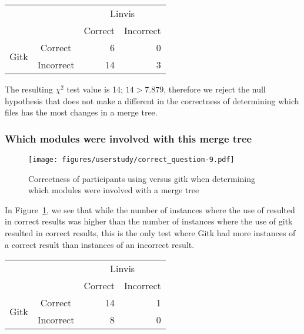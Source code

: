 \begin{center}
  \begin{tabular}{cc|rr}
                           &           & \multicolumn{2}{c}{Linvis}\\
                           &           & Correct                      & Incorrect\\\hline
    \multirow{2}{*}{Gitk}  & Correct   & 6                            & 0\\
                           & Incorrect & 14                           & 3\\
  \end{tabular}
\end{center}

The resulting $\chi^2$ test value is 14; $14 > 7.879$, therefore we
reject the null hypothesis that \tool does not make a different in the
correctness of determining which files has the most changes in a merge
tree.

\subsubsection{Which modules were involved with this merge tree}
\label{ssub:which_modules_were_involved_with_this_merge_tree}

\begin{figure}[htpb]
  \centering
  \texttt{[image: figures/userstudy/correct\_question-9.pdf]}
  \caption{Correctness of participants using \tool versus gitk when
    determining which modules were involved with a merge tree}
  \label{fig:q_9_correctness}
\end{figure}

In Figure~\ref{fig:q_9_correctness}, we see that while the number of
instances where the use of \tool resulted in correct results was higher
than the number of instances where the use of gitk resulted in correct
results, this is the only test where Gitk had more instances of a
correct result than instances of an incorrect result.




\begin{center}
  \begin{tabular}{cc|rr}
                            &           & \multicolumn{2}{c}{Linvis}\\
                            &           & Correct                      & Incorrect\\\hline
    \multirow{2}{*}{Gitk}   & Correct   & 14                           & 1\\
                            & Incorrect & 8                            & 0\\
  \end{tabular}
\end{center}

